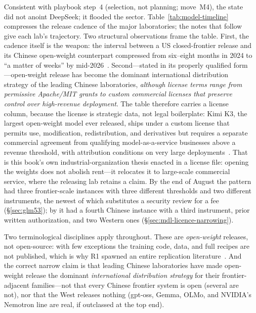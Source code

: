 Consistent with playbook step~4 (selection, not planning; move~M4), the state did not anoint DeepSeek; it flooded the sector. Table~\ref{tab:model-timeline} compresses the release cadence of the major laboratories; the notes that follow give each lab's trajectory. Two structural observations frame the table. First, the cadence itself is the weapon: the interval between a US closed-frontier release and its Chinese open-weight counterpart compressed from six--eight months in 2024 to ``a matter of weeks'' by mid-2026~\cite{aei-2026}. Second---stated in its properly qualified form---open-weight release has become the dominant international distribution strategy of the leading Chinese laboratories, \emph{although license terms range from permissive Apache/MIT grants to custom commercial licenses that preserve control over high-revenue deployment}. The table therefore carries a license column, because the license is strategic data, not legal boilerplate: Kimi K3, the largest open-weight model ever released, ships under a custom license that permits use, modification, redistribution, and derivatives but requires a separate commercial agreement from qualifying model-as-a-service businesses above a revenue threshold, with attribution conditions on very large deployments~\cite{kimiLicense}. That is this book's own industrial-organization thesis enacted in a license file: opening the weights does not abolish rent---it relocates it to large-scale commercial service, where the releasing lab retains a claim. By the end of August the pattern had three frontier-scale instances with three different thresholds and two different instruments, the newest of which substitutes a security review for a fee (\S\ref{sec:glm53}); by \datafreeze it had a fourth Chinese instance with a third instrument, prior written authorization, and two Western ones (\S\ref{sec:mdl-licence-narrowing}).

Two terminological disciplines apply throughout. These are \emph{open-weight} releases, not open-source: with few exceptions the training code, data, and full recipes are not published, which is why R1 spawned an entire replication literature~\cite{r1-replication}. And the correct narrow claim is that leading Chinese laboratories have made open-weight release the dominant \emph{international distribution strategy} for their frontier-adjacent families---not that every Chinese frontier system is open (several are not), nor that the West releases nothing (gpt-oss, Gemma, OLMo, and NVIDIA's Nemotron line are real, if outclassed at the top end).


